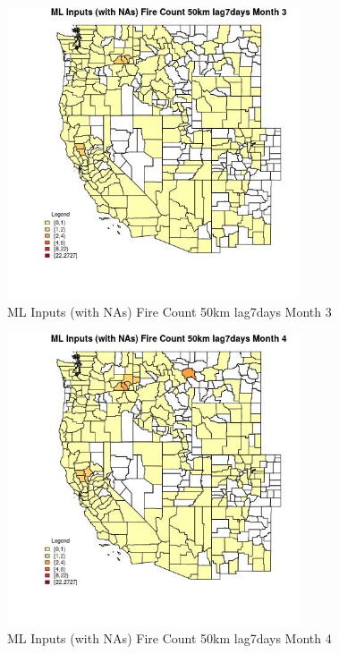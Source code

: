 \clearpage 

\begin{figure} 
\centering  
\includegraphics[width=0.77\textwidth]{Code_Outputs/Report_ML_input_PM25_Step4_part_f_de_duplicated_aves_prioritize_24hr_obswNAs_CountyFire_Count_50km_lag7daysmedianMonth3.jpg} 
\caption{\label{fig:Report_ML_input_PM25_Step4_part_f_de_duplicated_aves_prioritize_24hr_obswNAsCountyFire_Count_50km_lag7daysmedianMonth3}ML Inputs (with NAs) Fire Count 50km lag7days Month 3} 
\end{figure} 
 

\begin{figure} 
\centering  
\includegraphics[width=0.77\textwidth]{Code_Outputs/Report_ML_input_PM25_Step4_part_f_de_duplicated_aves_prioritize_24hr_obswNAs_CountyFire_Count_50km_lag7daysmedianMonth4.jpg} 
\caption{\label{fig:Report_ML_input_PM25_Step4_part_f_de_duplicated_aves_prioritize_24hr_obswNAsCountyFire_Count_50km_lag7daysmedianMonth4}ML Inputs (with NAs) Fire Count 50km lag7days Month 4} 
\end{figure} 
 

